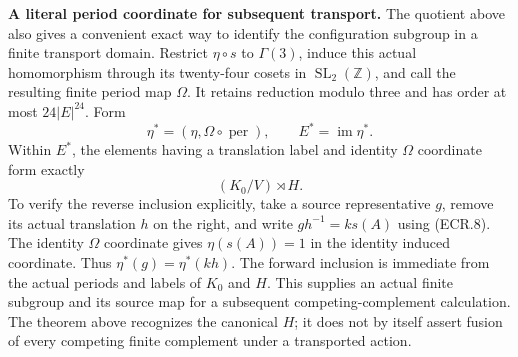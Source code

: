 \par\medskip\noindent\textbf{A literal period coordinate for subsequent transport.}\quad
The quotient above also gives a convenient exact way to identify the
configuration subgroup in a finite transport domain.  Restrict
$\eta\circ s$ to $\Gamma(3)$, induce this actual homomorphism through
its twenty-four cosets in $\operatorname{SL}_2(\mathbb Z)$, and call
the resulting finite period map $\Omega$.  It retains reduction
modulo three and has order at most $24|E|^{24}$.  Form
\[
 \eta^*=(\eta,\Omega\circ\operatorname{per}),\qquad
                         E^*=\operatorname{im}\eta^*.
                                                               \tag{ECR.21}
\]
Within $E^*$, the elements having a translation label and identity
$\Omega$ coordinate form exactly
\[
                      (K_0/V)\rtimes H.
                                                               \tag{ECR.22}
\]
To verify the reverse inclusion explicitly, take a source
representative $g$, remove its actual translation $h$ on the right,
and write $gh^{-1}=k s(A)$ using (ECR.8).  The identity $\Omega$
coordinate gives $\eta(s(A))=1$ in the identity induced coordinate.
Thus $\eta^*(g)=\eta^*(k h)$.  The forward inclusion is immediate
from the actual periods and labels of $K_0$ and $H$.
This supplies an actual finite subgroup and its source map for a
subsequent competing-complement calculation.  The theorem above
recognizes the canonical $H$; it does not by itself assert fusion of
every competing finite complement under a transported action.
